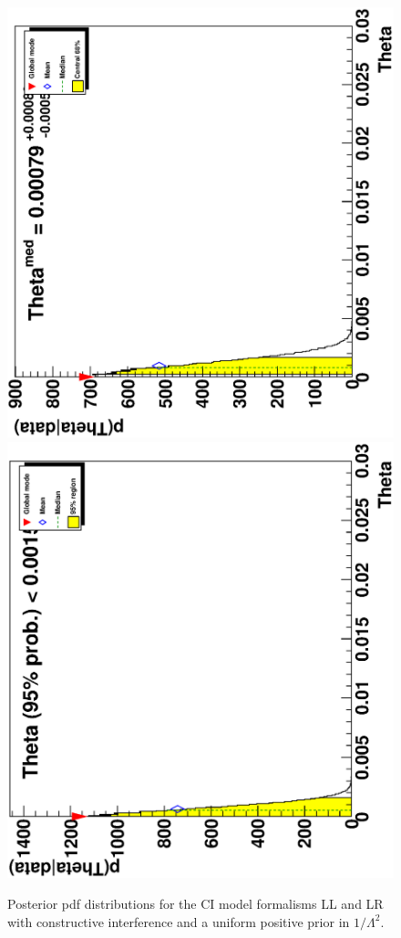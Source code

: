     \begin{figure}[h]
        \begin{center}
            \vspace{0.2em}\includegraphics[width=0.45\linewidth,natwidth=610,natheight=642,angle=-90]{images/ee__LL_minus_L2/post.ps}
            \includegraphics[width=0.45\linewidth,natwidth=610,natheight=642,angle=-90]{images/ee__LR_minus_L2/post.ps}
        \end{center}
        \vspace{-4.0em}
       \caption{Posterior pdf distributions for the CI model formalisms LL and LR with constructive interference and a uniform positive prior in $1/\Lambda^{2}$.}
       \label{fig:pdf_CI_main}
    \end{figure}




